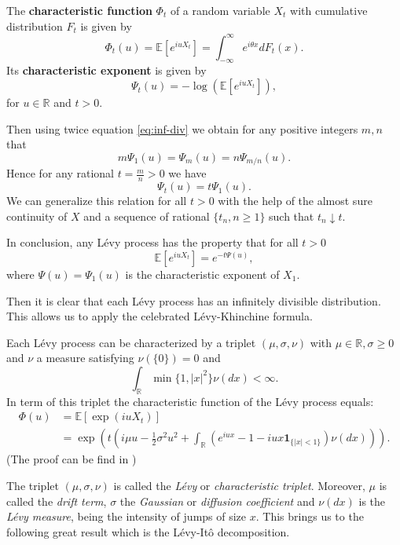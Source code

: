 \begin{defn}
The \textbf{characteristic function} $\Phi_t$ of a random variable $X_t$ with cumulative distribution $F_t$ is given by
$$\Phi_t(u) = \mathbb{E}\left[e^{iu X_t}\right]=\int_{-\infty}^{\infty}e^{i\theta x}dF_t(x).$$
Its \textbf{characteristic exponent} is given by
$$\Psi_t(u) = -\log\left(\mathbb{E}\left[e^{iu X_t}\right]\right),$$
for $u \in\mathbb{R}$ and $t>0$.
\end{defn}

 Then using twice equation \eqref{eq:inf-div} we obtain for any positive integers $m,n$ that
$$m\Psi_1(u) = \Psi_m(u) = n \Psi_{m/n}(u).$$
Hence for any rational $t=\frac{m}{n}>0$ we have
$$\Psi_t(u) = t\Psi_1(u).$$
We can generalize this relation for all $t>0$ with the help of the almost sure continuity of $X$ and a sequence of rational $\{t_n, n\geq 1\}$ such that $t_n\downarrow t$.

In conclusion, any L\'evy process has the property that for all $t>0$
$$\mathbb{E}\left[e^{iu X_t}\right] = e^{-t\Psi(u)},$$
where $\Psi(u) = \Psi_1(u)$ is the characteristic exponent of $X_1$.

Then it is clear that each L\'evy process has an infinitely divisible distribution. This allows us to apply the celebrated L\'evy-Khinchine formula. 

\begin{thm}
Each L\'evy process can be characterized by a triplet $(\mu,\sigma,\nu)$ with $\mu \in \mathbb{R},\sigma \geq 0$ and $\nu$ a measure satisfying $\nu(\{0\}) = 0$ and
$$\int_\mathbb{R} \min\{1,|x|^2\}\nu(dx)<\infty.$$
In term of this triplet the characteristic function of the L\'evy process equals:
\begin{align}\label{eq:LK}
\Phi(u) &= \mathbb{E}\left[\exp(i u X_t)\right]\nonumber\\
&= \exp\left(t\left(i\mu u -\frac{1}{2}\sigma^2u^2+\int_\mathbb{R}\left(e^{iux}-1-iux\mathbf{1}_{\{|x|<1\}}\right)\nu(dx)\right)\right).
\end{align}
(The proof can be find in \citeauthor{TC03} \citeyearpar{TC03})
\end{thm}

The triplet $(\mu,\sigma,\nu)$ is called the \textit{L\'evy} or \textit{characteristic triplet}. Moreover, $\mu$ is called the \textit{drift term}, $\sigma$ the \textit{Gaussian} or \textit{diffusion coefficient} and $\nu(dx)$ is the \textit{L\'evy measure}, being the intensity of jumps of size $x$. This brings us to the following great result which is the L\'evy-Itô decomposition.

